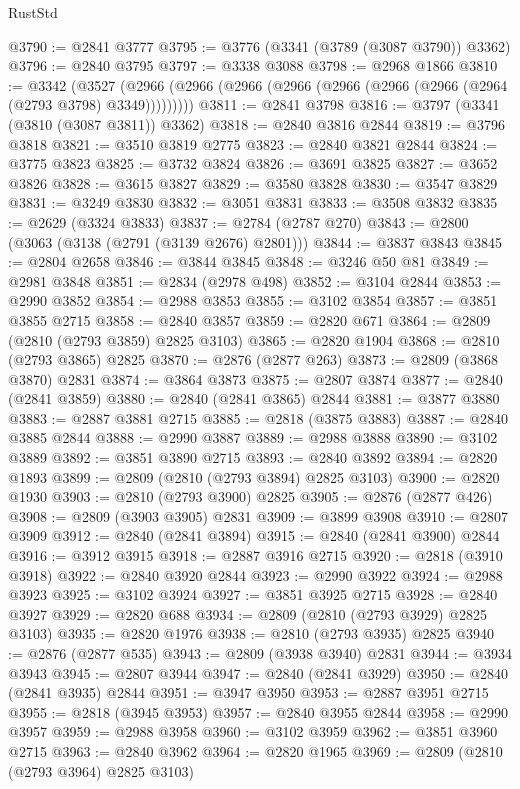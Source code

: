 \begin{lexlean}{RustStd}
\begin{coremodule}
@3790 := @2841 @3777
@3795 := @3776 (@3341 (@3789 (@3087 @3790)) @3362)
@3796 := @2840 @3795
@3797 := @3338 @3088
@3798 := @2968 @1866
@3810 := @3342
    (@3527 (@2966 (@2966 (@2966 (@2966 (@2966 (@2966 (@2966 (@2964 (@2793 @3798) @3349)))))))))
@3811 := @2841 @3798
@3816 := @3797 (@3341 (@3810 (@3087 @3811)) @3362)
@3818 := @2840 @3816 @2844
@3819 := @3796 @3818
@3821 := @3510 @3819 @2775
@3823 := @2840 @3821 @2844
@3824 := @3775 @3823
@3825 := @3732 @3824
@3826 := @3691 @3825
@3827 := @3652 @3826
@3828 := @3615 @3827
@3829 := @3580 @3828
@3830 := @3547 @3829
@3831 := @3249 @3830
@3832 := @3051 @3831
@3833 := @3508 @3832
@3835 := @2629 (@3324 @3833)
@3837 := @2784 (@2787 @270)
@3843 := @2800 (@3063 (@3138 (@2791 (@3139 @2676) @2801)))
@3844 := @3837 @3843
@3845 := @2804 @2658
@3846 := @3844 @3845
@3848 := @3246 @50 @81
@3849 := @2981 @3848
@3851 := @2834 (@2978 @498)
@3852 := @3104 @2844
@3853 := @2990 @3852
@3854 := @2988 @3853
@3855 := @3102 @3854
@3857 := @3851 @3855 @2715
@3858 := @2840 @3857
@3859 := @2820 @671
@3864 := @2809 (@2810 (@2793 @3859) @2825 @3103)
@3865 := @2820 @1904
@3868 := @2810 (@2793 @3865) @2825
@3870 := @2876 (@2877 @263)
@3873 := @2809 (@3868 @3870) @2831
@3874 := @3864 @3873
@3875 := @2807 @3874
@3877 := @2840 (@2841 @3859)
@3880 := @2840 (@2841 @3865) @2844
@3881 := @3877 @3880
@3883 := @2887 @3881 @2715
@3885 := @2818 (@3875 @3883)
@3887 := @2840 @3885 @2844
@3888 := @2990 @3887
@3889 := @2988 @3888
@3890 := @3102 @3889
@3892 := @3851 @3890 @2715
@3893 := @2840 @3892
@3894 := @2820 @1893
@3899 := @2809 (@2810 (@2793 @3894) @2825 @3103)
@3900 := @2820 @1930
@3903 := @2810 (@2793 @3900) @2825
@3905 := @2876 (@2877 @426)
@3908 := @2809 (@3903 @3905) @2831
@3909 := @3899 @3908
@3910 := @2807 @3909
@3912 := @2840 (@2841 @3894)
@3915 := @2840 (@2841 @3900) @2844
@3916 := @3912 @3915
@3918 := @2887 @3916 @2715
@3920 := @2818 (@3910 @3918)
@3922 := @2840 @3920 @2844
@3923 := @2990 @3922
@3924 := @2988 @3923
@3925 := @3102 @3924
@3927 := @3851 @3925 @2715
@3928 := @2840 @3927
@3929 := @2820 @688
@3934 := @2809 (@2810 (@2793 @3929) @2825 @3103)
@3935 := @2820 @1976
@3938 := @2810 (@2793 @3935) @2825
@3940 := @2876 (@2877 @535)
@3943 := @2809 (@3938 @3940) @2831
@3944 := @3934 @3943
@3945 := @2807 @3944
@3947 := @2840 (@2841 @3929)
@3950 := @2840 (@2841 @3935) @2844
@3951 := @3947 @3950
@3953 := @2887 @3951 @2715
@3955 := @2818 (@3945 @3953)
@3957 := @2840 @3955 @2844
@3958 := @2990 @3957
@3959 := @2988 @3958
@3960 := @3102 @3959
@3962 := @3851 @3960 @2715
@3963 := @2840 @3962
@3964 := @2820 @1965
@3969 := @2809 (@2810 (@2793 @3964) @2825 @3103)

\end{coremodule}
\end{lexlean}
